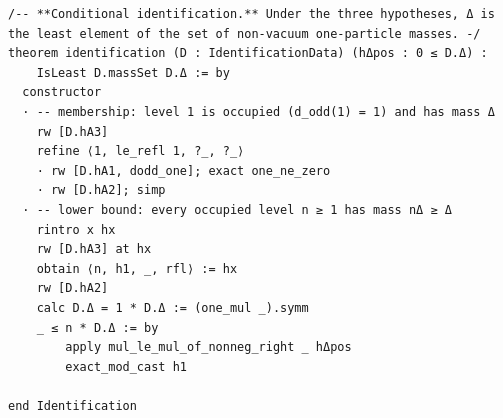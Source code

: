 \documentclass[11pt,a4paper]{article}
\theoremstyle{plain}
\theoremstyle{definition}
\theoremstyle{remark}
\begin{document}
\begin{Verbatim}[fontsize=\footnotesize,breaklines=true,breakanywhere=true,formatcom=\leanmono]
/-- **Conditional identification.** Under the three hypotheses, Δ is
the least element of the set of non-vacuum one-particle masses. -/
theorem identification (D : IdentificationData) (hΔpos : 0 ≤ D.Δ) :
    IsLeast D.massSet D.Δ := by
  constructor
  · -- membership: level 1 is occupied (d_odd(1) = 1) and has mass Δ
    rw [D.hA3]
    refine ⟨1, le_refl 1, ?_, ?_⟩
    · rw [D.hA1, dodd_one]; exact one_ne_zero
    · rw [D.hA2]; simp
  · -- lower bound: every occupied level n ≥ 1 has mass nΔ ≥ Δ
    rintro x hx
    rw [D.hA3] at hx
    obtain ⟨n, h1, _, rfl⟩ := hx
    rw [D.hA2]
    calc D.Δ = 1 * D.Δ := (one_mul _).symm
    _ ≤ n * D.Δ := by
        apply mul_le_mul_of_nonneg_right _ hΔpos
        exact_mod_cast h1

end Identification
\end{Verbatim}
\end{document}

